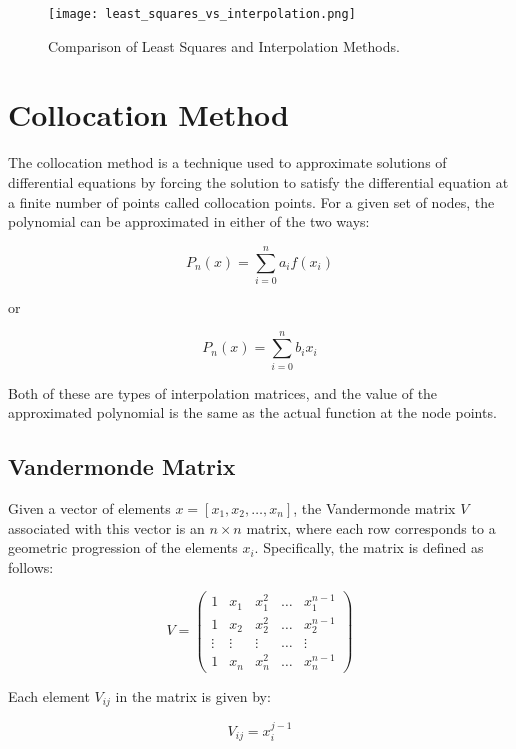 \documentclass[12pt]{report} %
\begin{document}
\begin{figure}[h]
    \centering
    \texttt{[image: least\_squares\_vs\_interpolation.png]} %
    \caption{Comparison of Least Squares and Interpolation Methods.}
    \label{fig:comparison_plot}
\end{figure}

\section{Collocation Method}
The collocation method is a technique used to approximate solutions of differential equations by forcing the solution to satisfy the differential equation at a finite number of points called collocation points.
For a given set of nodes, the polynomial can be approximated in either of the two ways:

\begin{equation}
    P_n(x) = \sum_{i=0}^{n} a_i f(x_i)
\end{equation}

or

\begin{equation}
    P_n(x) = \sum_{i=0}^{n} b_i x_i
\end{equation}

Both of these are types of interpolation matrices, and the value of the approximated polynomial is the same as the actual function at the node points.

\subsection{Vandermonde Matrix}
Given a vector of elements \( x = [x_1, x_2, \dots, x_n] \), the Vandermonde matrix \( V \) associated with this vector is an \( n \times n \) matrix, where each row corresponds to a geometric progression of the elements \( x_i \). Specifically, the matrix is defined as follows:

\[
V = \begin{pmatrix}
    1 & x_1 & x_1^2 & \dots & x_1^{n-1} \\
    1 & x_2 & x_2^2 & \dots & x_2^{n-1} \\
    \vdots & \vdots & \vdots & \dots & \vdots \\
    1 & x_n & x_n^2 & \dots & x_n^{n-1} 
\end{pmatrix}
\]

Each element \( V_{ij} \) in the matrix is given by:

\begin{equation}
    V_{ij} = x_i^{j-1}
\end{equation}
\end{document}
